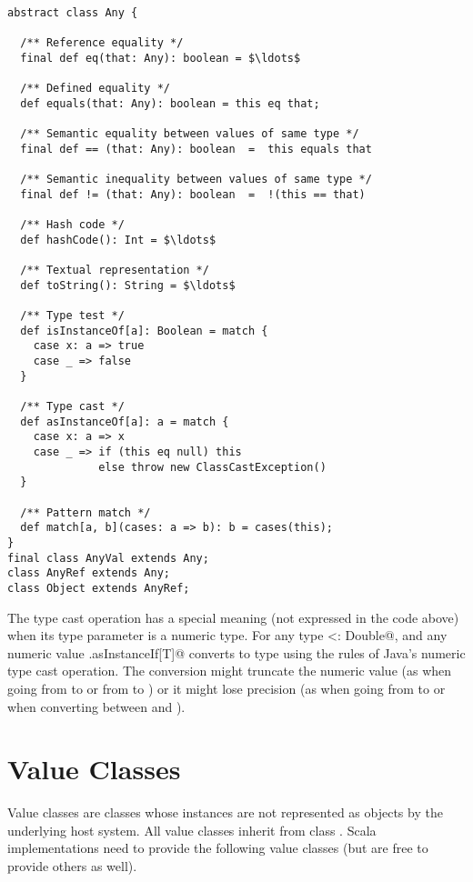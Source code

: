 \documentclass[a4paper,12pt,twoside,titlepage]{book}
\begin{document}
\begin{lstlisting}
abstract class Any {

  /** Reference equality */
  final def eq(that: Any): boolean = $\ldots$

  /** Defined equality */
  def equals(that: Any): boolean = this eq that;

  /** Semantic equality between values of same type */
  final def == (that: Any): boolean  =  this equals that

  /** Semantic inequality between values of same type */
  final def != (that: Any): boolean  =  !(this == that)

  /** Hash code */
  def hashCode(): Int = $\ldots$

  /** Textual representation */
  def toString(): String = $\ldots$

  /** Type test */
  def isInstanceOf[a]: Boolean = match {
    case x: a => true
    case _ => false
  }

  /** Type cast */
  def asInstanceOf[a]: a = match {
    case x: a => x
    case _ => if (this eq null) this
              else throw new ClassCastException()
  }

  /** Pattern match */
  def match[a, b](cases: a => b): b = cases(this);
}
final class AnyVal extends Any;
class AnyRef extends Any;
class Object extends AnyRef;
\end{lstlisting}

The type cast operation \verb@asInstanceOf@ has a special meaning (not
expressed in the code above) when its type parameter is a numeric
type.  For any type \lstinline@T <: Double@, and any numeric value
\verb@v@ \lstinline@v.asInstanceIf[T]@ converts  to type
 using the rules of Java's numeric type cast operation.  The
conversion might truncate the numeric value (as when going from
 to  or from  to ) or it
might lose precision (as when going from  to 
or when converting between  and ).

\section{Value Classes}
\label{sec:cls-value}

Value classes are classes whose instances are not represented as
objects by the underlying host system.  All value classes inherit from
class . Scala implementations need to provide the
following value classes (but are free to provide others as well).
\end{document}
